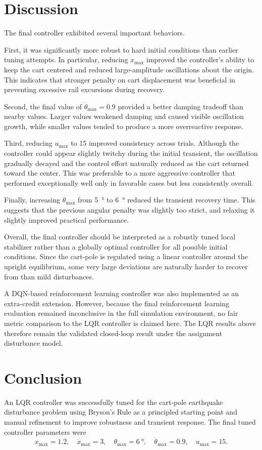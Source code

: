 \documentclass[11pt]{article}
\begin{document}
\section{Discussion}
The final controller exhibited several important behaviors.

First, it was significantly more robust to hard initial conditions than earlier tuning attempts. In particular, reducing $x_{\max}$ improved the controller's ability to keep the cart centered and reduced large-amplitude oscillations about the origin. This indicates that stronger penalty on cart displacement was beneficial in preventing excessive rail excursions during recovery.

Second, the final value of $\dot{\theta}_{\max}=0.9$ provided a better damping tradeoff than nearby values. Larger values weakened damping and caused visible oscillation growth, while smaller values tended to produce a more overreactive response.

Third, reducing $u_{\max}$ to 15 improved consistency across trials. Although the controller could appear slightly twitchy during the initial transient, the oscillation gradually decayed and the control effort naturally reduced as the cart returned toward the center. This was preferable to a more aggressive controller that performed exceptionally well only in favorable cases but less consistently overall.

Finally, increasing $\theta_{\max}$ from \SI{5}{\degree} to \SI{6}{\degree} reduced the transient recovery time. This suggests that the previous angular penalty was slightly too strict, and relaxing it slightly improved practical performance.

Overall, the final controller should be interpreted as a robustly tuned local stabilizer rather than a globally optimal controller for all possible initial conditions. Since the cart-pole is regulated using a linear controller around the upright equilibrium, some very large deviations are naturally harder to recover from than mild disturbances.

A DQN-based reinforcement learning controller was also implemented as an extra-credit extension. However, because the final reinforcement learning evaluation remained inconclusive in the full simulation environment, no fair metric comparison to the LQR controller is claimed here. The LQR results above therefore remain the validated closed-loop result under the assignment disturbance model.

\newpage
\section{Conclusion}
An LQR controller was successfully tuned for the cart-pole earthquake disturbance problem using Bryson's Rule as a principled starting point and manual refinement to improve robustness and transient response. The final tuned controller parameters were
\[
x_{\max}=1.2,\quad
\dot{x}_{\max}=3,\quad
\theta_{\max}=\SI{6}{\degree},\quad
\dot{\theta}_{\max}=0.9,\quad
u_{\max}=15.
\]
\end{document}
